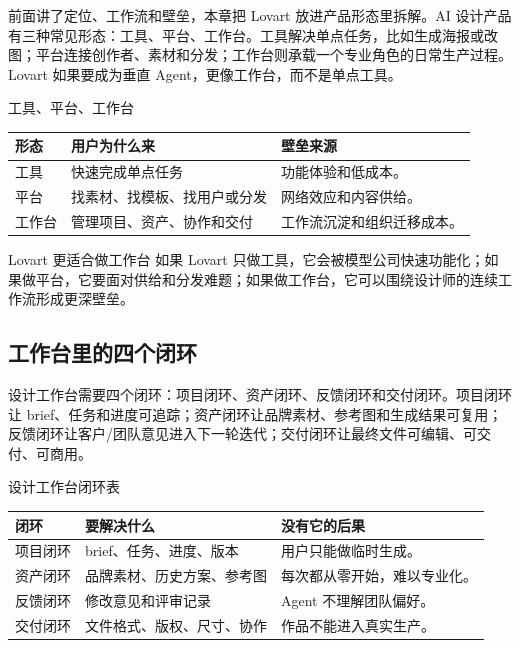 \documentclass[a4paper]{article}
\begin{document}
前面讲了定位、工作流和壁垒，本章把 Lovart 放进产品形态里拆解。AI 设计产品有三种常见形态：工具、平台、工作台。工具解决单点任务，比如生成海报或改图；平台连接创作者、素材和分发；工作台则承载一个专业角色的日常生产过程。Lovart 如果要成为垂直 Agent，更像工作台，而不是单点工具。

\begin{knowledgebox}{工具、平台、工作台}
\begin{tabularx}{\textwidth}{p{}p{}X}
\toprule
形态 & 用户为什么来 & 壁垒来源 \\
\midrule
工具 & 快速完成单点任务 & 功能体验和低成本。 \\
平台 & 找素材、找模板、找用户或分发 & 网络效应和内容供给。 \\
工作台 & 管理项目、资产、协作和交付 & 工作流沉淀和组织迁移成本。 \\
\bottomrule
\end{tabularx}
\end{knowledgebox}

\begin{importantbox}{Lovart 更适合做工作台}
如果 Lovart 只做工具，它会被模型公司快速功能化；如果做平台，它要面对供给和分发难题；如果做工作台，它可以围绕设计师的连续工作流形成更深壁垒。
\end{importantbox}

\subsection{工作台里的四个闭环}

设计工作台需要四个闭环：项目闭环、资产闭环、反馈闭环和交付闭环。项目闭环让 brief、任务和进度可追踪；资产闭环让品牌素材、参考图和生成结果可复用；反馈闭环让客户/团队意见进入下一轮迭代；交付闭环让最终文件可编辑、可交付、可商用。

\begin{knowledgebox}{设计工作台闭环表}
\begin{tabularx}{\textwidth}{p{}p{}X}
\toprule
闭环 & 要解决什么 & 没有它的后果 \\
\midrule
项目闭环 & brief、任务、进度、版本 & 用户只能做临时生成。 \\
资产闭环 & 品牌素材、历史方案、参考图 & 每次都从零开始，难以专业化。 \\
反馈闭环 & 修改意见和评审记录 & Agent 不理解团队偏好。 \\
交付闭环 & 文件格式、版权、尺寸、协作 & 作品不能进入真实生产。 \\
\bottomrule
\end{tabularx}
\end{knowledgebox}
\end{document}
